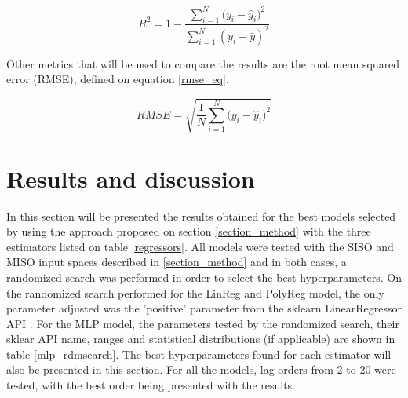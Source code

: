 \documentclass[conference]{IEEEtran}
\begin{document}
\begin{equation}\label{r2_eq}
    R^2 = 1 - \frac{\sum_{i=1}^N{(y_i - \hat{y}_i})^2}{\sum_{i=1}^N{(y_i - \bar{y})^2}}
\end{equation}

Other metrics that will be used to compare the results are the root mean squared error (RMSE), defined on equation \ref{rmse_eq}. 


\begin{equation}\label{rmse_eq}
    RMSE = \sqrt{\frac{1}{N}\sum_{i=1}^N{(y_i - \hat{y}_i})^2}
\end{equation}



\section{Results and discussion}\label{section_results}

%
%
%

In this section will be presented the results obtained for the best models selected by using the approach proposed on section \ref{section_method} with the three estimators listed on table \ref{regressors}. All models were tested with the SISO and MISO input spaces described in \ref{section_method} and in both cases, a randomized search was performed in order to select the best hyperparameters. On the randomized search performed for the LinReg and PolyReg model, the only parameter adjusted was the 'positive' parameter from the sklearn LinearRegressor API \cite{sklearn_manual}. For the MLP model, the parameters tested by the randomized search, their sklear API name, ranges and statistical distributions (if applicable) are shown in table \ref{mlp_rdmsearch}. The best hyperparameters found for each estimator will also be presented in this section. For all the models, lag orders from 2 to 20 were tested, with the best order being presented with the results.
\end{document}
